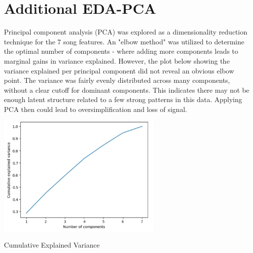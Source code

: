\documentclass{article}
\begin{document}
\section{Additional EDA-PCA}
Principal component analysis (PCA) was explored as a dimensionality reduction technique for the 7 song features.  An "elbow method" was utilized to determine the optimal number of components - where adding more components leads to marginal gains in variance explained. However, the plot below showing the variance explained per principal component did not reveal an obvious elbow point. The variance was fairly evenly distributed across many components, without a clear cutoff for dominant components. This indicates there may not be enough latent structure related to a few strong patterns in this data. Applying PCA then could lead to oversimplification and loss of signal.
\begin{center}
  \centering
  \includegraphics[width=0.6\textwidth]{PCA.jpeg} %
\end{center}
\begin{center}
  \footnotesize{Cumulative Explained Variance}
\end{center}
\end{document}
